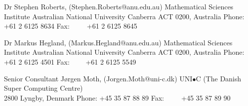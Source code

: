 \documentclass[12pt,a4paper]{article}
\begin{document}

\noindent Dr Stephen Roberts, (Stephen.Roberts@anu.edu.au)\newline
Mathematical Sciences Institute \newline
Australian National University \newline
Canberra ACT 0200, Australia \newline
Phone: +61 2 6125 8634 \newline
Fax:\ \ \ \ \  +61 2 6125 8645 \newline


\noindent Dr Markus Hegland, (Markus.Hegland@anu.edu.au)\newline
Mathematical Sciences Institute \newline           
Australian National University \newline   
Canberra ACT 0200, Australia \newline    
Phone: +61 2 6125 4501 \newline         
Fax: \ \ \ \ +61 2 6125 5549 \newline

\noindent Senior Consultant J{\o}rgen Moth, (Jorgen.Moth@uni-c.dk)\newline
UNI$\bullet$C (The Danish Super Computing Centre) \\
2800 Lyngby, Denmark \newline
Phone: +45 35 87 88 89 \newline
Fax:\ \ \ \ \  +45 35 87 89 90 \newline


\end{document}
